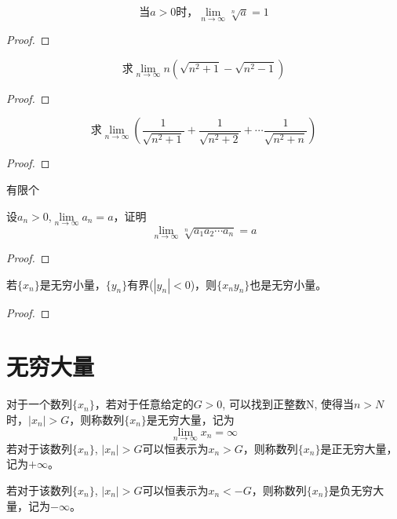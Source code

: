 \documentclass[lang=cn]{elegantbook}
\begin{document}
\begin{proposition}
    \[\text{当} a > 0 \text{时，} \lim\limits_{n \to \infty} \sqrt[n]{a} = 1 \]
\end{proposition}
\begin{proof}
    
\end{proof}

\begin{proposition}
    \[\text{求}\lim\limits_{n \to \infty} n\left( \sqrt{n^2+1} - \sqrt{n^2 - 1}\right) \]
\end{proposition}
\begin{proof}
    
\end{proof}

\begin{proposition}
    \[\text{求}\lim\limits_{n \to \infty} \left( \frac{1}{\sqrt{n^2+1}} + \frac{1}{\sqrt{n^2 + 2}} + \cdots \frac{1}{\sqrt{n^2+n}} \right) \]
\end{proposition}
\begin{proof}
    
\end{proof}
有限个

\begin{proposition}
    设$a_n > 0$,$\lim\limits_{n \to \infty} a_n = a$，证明
    \[ \lim_{n \to \infty}\sqrt[n]{a_1a_2\cdots a_n} = a \]
\end{proposition}
\begin{proof}
    
\end{proof}

\begin{proposition}
    若$\{ x_n \}$是无穷小量，$\{ y_n \}$有界($| y_n | < 0$)，则$\{ x_n y_n \}$也是无穷小量。
\end{proposition}
\begin{proof}

\end{proof}

\section{无穷大量}
\begin{definition}[无穷大量]
对于一个数列$\{ x_n \}$，若对于任意给定的$G > 0$, 可以找到正整数N, 使得当$n > N$时，$| x_n |> G$，则称数列$\{ x_n \}$是无穷大量，记为
\[ \lim_{n \to \infty } x_n = \infty \]
若对于该数列$\{ x_n \}$, $| x_n |> G$可以恒表示为$x_n > G$，则称数列$\{ x_n \}$是正无穷大量，记为$+\infty$。

若对于该数列$\{ x_n \}$, $| x_n |> G$可以恒表示为$x_n < -G$，则称数列$\{ x_n \}$是负无穷大量，记为$-\infty$。
\end{definition}
\end{document}
